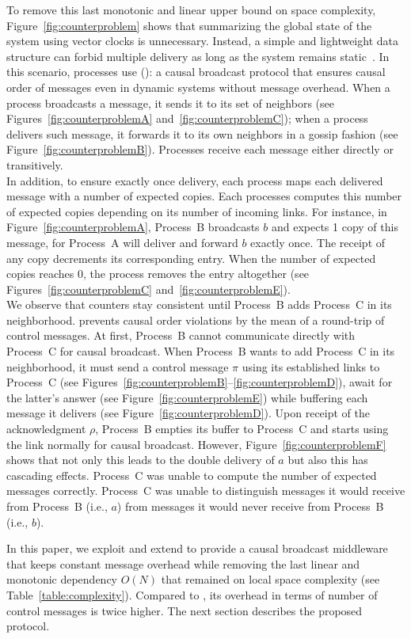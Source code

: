 To remove this last monotonic and linear upper bound on space complexity,
Figure~\ref{fig:counterproblem} shows that summarizing the global state of the
system using vector clocks is unnecessary. Instead, a simple and lightweight
data structure can forbid multiple delivery as long as the system remains
static~\cite{raynal2013distributed}. In this scenario, processes use
\PCBROADCAST (\REF): a causal broadcast protocol that ensures causal order of
messages even in dynamic systems without message overhead.  When a process
broadcasts a message, it sends it to its set of neighbors (see
Figures~\ref{fig:counterproblemA} and~\ref{fig:counterproblemC}); when a process
delivers such message, it forwards it to its own neighbors in a gossip fashion
(see Figure~\ref{fig:counterproblemB}). Processes receive each message either
directly or transitively.\\
In addition, to ensure exactly once delivery, each process maps each delivered
message with a number of expected copies. Each processes computes this number of
expected copies depending on its number of incoming links. For instance, in
Figure~\ref{fig:counterproblemA}, Process~B broadcasts $b$ and expects 1 copy of
this message, for Process~A will deliver and forward $b$ exactly once. The
receipt of any copy decrements its corresponding entry.  When the number of
expected copies reaches 0, the process removes the entry altogether (see
Figures~\ref{fig:counterproblemC} and~\ref{fig:counterproblemE}).\\ We observe
that counters stay consistent until Process~B adds Process~C in its
neighborhood. \PCBROADCAST prevents causal order violations by the mean of a
round-trip of control messages.  At first, Process~B cannot communicate directly
with Process~C for causal broadcast. When Process~B wants to add Process~C in
its neighborhood, it must send a control message $\pi$ using its established
links to Process~C (see
Figures~\ref{fig:counterproblemB}--\ref{fig:counterproblemD}), await for the
latter's answer (see Figure~\ref{fig:counterproblemE}) while buffering each
message it delivers (see Figure~\ref{fig:counterproblemD}). Upon receipt of the
acknowledgment $\rho$, Process~B empties its buffer to Process~C and starts
using the link normally for causal broadcast. However,
Figure~\ref{fig:counterproblemF} shows that not only this leads to the double
delivery of $a$ but also this has cascading effects. Process~C was unable to
compute the number of expected messages correctly. Process~C was unable to
distinguish messages it would receive from Process~B (i.e., $a$) from messages
it would never receive from Process~B (i.e., $b$).

In this paper, we exploit and extend \PCBROADCAST to provide a causal broadcast
middleware that keeps constant message overhead while removing the last linear
and monotonic dependency $O(N)$ that remained on local space complexity (see
Table~\ref{table:complexity}). Compared to \PCBROADCAST, its overhead in terms
of number of control messages is twice higher.  The next section describes the
proposed protocol.


